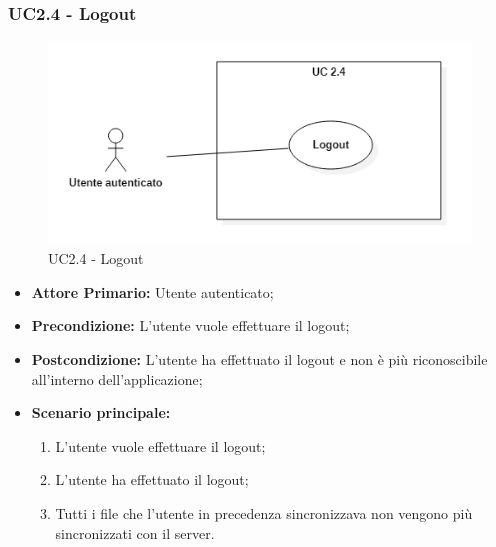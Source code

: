 \subsubsection{UC2.4 - Logout}
\begin{figure}[H]
    \centering
    \includegraphics[scale = 0.7]{components/img/UC2_4.png}
    \caption{UC2.4 - Logout}
\end{figure}
\begin{itemize}
\item \textbf{Attore Primario:} Utente autenticato;
\item \textbf{Precondizione:} L'utente vuole effettuare il logout;
\item \textbf{Postcondizione:} L'utente ha effettuato il logout e non è più riconoscibile all'interno dell'applicazione;
\item \textbf{Scenario principale:}
    \begin{enumerate}
    \item L'utente vuole effettuare il logout;
    \item L'utente ha effettuato il logout;
    \item Tutti i file che l'utente in precedenza sincronizzava non vengono più sincronizzati con il server.
    \end{enumerate}
\end{itemize}